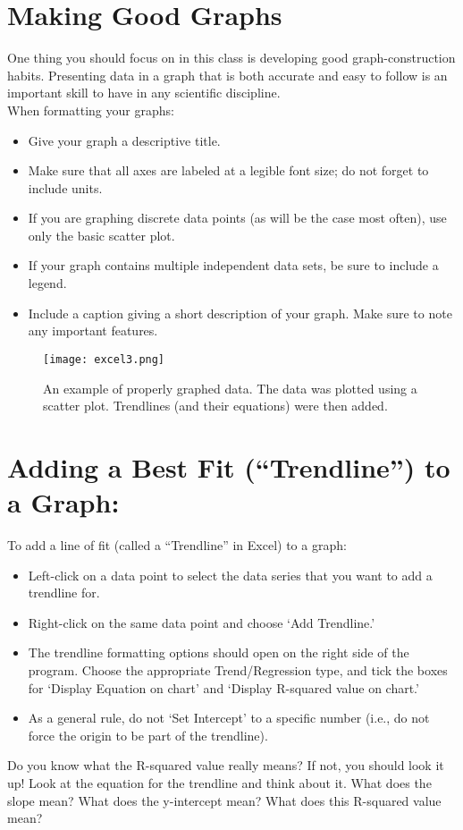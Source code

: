 \section*{Making Good Graphs}
One thing you should focus on in this class is developing good graph-construction habits.
Presenting data in a graph that is both accurate and easy to follow is an important skill to have in any scientific discipline. \\
When formatting your graphs:
\begin{itemize}
\itemsep-0.3em
\item Give your graph a descriptive title.
\item Make sure that all axes are labeled at a legible font size; do not forget to include units.
\item If you are graphing discrete data points (as will be the case most often), use only the basic scatter plot.
\item If your graph contains multiple independent data sets, be sure to include a legend.
\item Include a caption giving a short description of your graph. Make sure to note any important features.
\end{itemize}
\begin{figure}[ht]
\texttt{[image: excel3.png]}
\centering
\caption{An example of properly graphed data. The data was plotted using a scatter plot. Trendlines (and their equations) were then added.}
\label{fig:exc3}
\end{figure}

\section*{Adding a Best Fit (``Trendline'') to a Graph:}
To add a line of fit (called a ``Trendline'' in Excel) to a graph:
\begin{itemize}
\itemsep-0.3em
\item Left-click on a data point to select the data series that you want to add a trendline for.
\item Right-click on the same data point and choose `Add Trendline.' 
\item The trendline formatting options should open on the right side of the program. Choose the appropriate Trend/Regression type, and tick the boxes for `Display Equation on chart' and `Display R-squared value on chart.' 
\item As a general rule, do not `Set Intercept' to a specific number (i.e., do not force the origin to be part of the trendline). 
\end{itemize}
Do you know what the R-squared value really means? 
If not, you should look it up! 
Look at the equation for the trendline and think about it. 
What does the slope mean? 
What does the y-intercept mean? What does this R-squared value mean?

